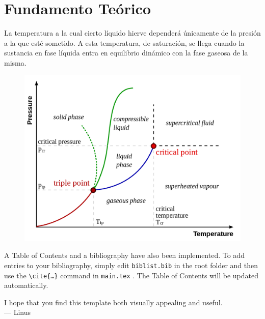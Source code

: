 \documentclass[12pt]{article}
\begin{document}
\section{Fundamento Teórico}
    La temperatura a la cual cierto líquido hierve dependerá únicamente de la presión a la que esté sometido. A esta temperatura, de saturación,  se llega cuando la sustancia en fase líquida entra en equilibrio dinámico con la fase gaseosa de la misma. \\
 \begin{figure} %
    \centering
    \includegraphics[scale = 0.2]{diagfase.png}
\end{figure}
    

A Table of Contents and a bibliography have also been implemented. To add entries to your bibliography, simply edit \texttt{biblist.bib} in the root folder and then use the \texttt{\textbackslash cite\{\ldots\}} command in \texttt{main.tex} \cite{bibtex}. The Table of Contents will be updated automatically.

I hope that you find this template both visually appealing and useful. \\

\hspace{1 cm}--- Linus

\newpage


\end{document}
